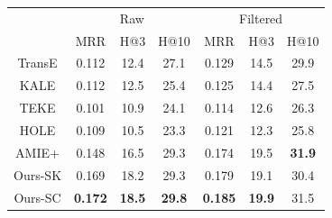 \begin{table}[b]
	\centering
	\label{tab:link-pred-patty}
	\begin{tabular}{c|ccc|ccc}
		\hline
				&	\multicolumn{3}{c|}{Raw}
				&	\multicolumn{3}{c}{Filtered}	\\
		\cline{2-7}	
				&	MRR	&	H@3	&	H@10
				&	MRR	&	H@3	&	H@10		\\
		\hline
		TransE
				&	0.112	&	12.4	&	27.1
				&	0.129	&	14.5	&	29.9	\\	%
		KALE
				&	0.112	&	12.5	&	25.4
				&	0.125	&	14.4	&	27.5	\\	%
		TEKE
				&	0.101	&	10.9	&	24.1
				&	0.114	&	12.6	&	26.3	\\
		HOLE
				&	0.109	&	10.5	&	23.3
				&	0.121	& 	12.3	&	25.8	\\	%
		AMIE+
				&	0.148	&	16.5	&	29.3
				&	0.174	&	19.5	&	\textbf{31.9}	\\
		\hline
		Ours-SK
				&	0.169	&	18.2	&	29.3
				&	0.179	&	19.1	&	30.4	\\		%
		Ours-SC
				&	\textbf{0.172}		&	\textbf{18.5}	&	\textbf{29.8}
				&	\textbf{0.185}		&	\textbf{19.9}	&	31.5	\\	%
		\hline
	\end{tabular}
\end{table}

